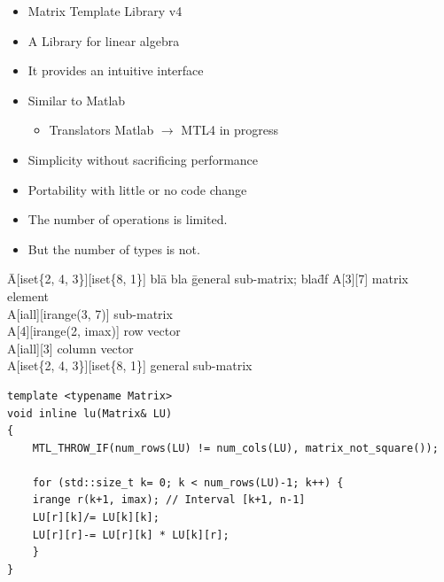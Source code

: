 \begin{frame}
  \begin{itemize}
  \item Matrix Template Library v4
  \item A Library for linear algebra
  \item It provides an intuitive interface
  \item Similar to Matlab
    \begin{itemize}
    \item Translators Matlab $\rightarrow$ MTL4 in progress
    \end{itemize}
  \item Simplicity without sacrificing performance
  \item Portability with little or no code change

  \end{itemize}

\end{frame}

\begin{frame}
  \begin{itemize}
  \item The number of operations is limited.
  \item But the number of types is not.
  \end{itemize}
  \small
  \begin{tabbing}
  \= A[iset\{2, 4, 3\}][iset\{8, 1\}] bla\=  bla \=general sub-matrix; bla\= df \kill
  \>A[3][7]\> \> matrix element\\
  \>A[iall][irange(3, 7)]\> \> sub-matrix\\
  \>A[4][irange(2, imax)]\> \> row vector\\
  \>A[iall][3]\> \> column vector\\
  \>A[iset\{2, 4, 3\}][iset\{8, 1\}]\> \> general sub-matrix \\
\end{tabbing}
\end{frame}


\begin{frame}[containsverbatim]
\begin{lstlisting}
template <typename Matrix>
void inline lu(Matrix& LU)
{
    MTL_THROW_IF(num_rows(LU) != num_cols(LU), matrix_not_square());

    for (std::size_t k= 0; k < num_rows(LU)-1; k++) {
	irange r(k+1, imax); // Interval [k+1, n-1]
	LU[r][k]/= LU[k][k];
	LU[r][r]-= LU[r][k] * LU[k][r];
    }
}
\end{lstlisting}
\end{frame}



